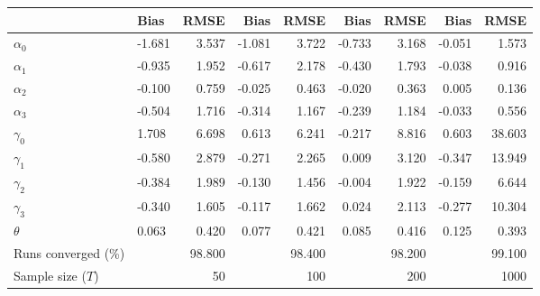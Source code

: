 
\begin{tabular}[t]{llrrrrrrr}
\toprule
  & Bias & RMSE & Bias & RMSE & Bias & RMSE & Bias & RMSE\\
\midrule
$\alpha_{0}$ & -1.681 & 3.537 & -1.081 & 3.722 & -0.733 & 3.168 & -0.051 & 1.573\\
$\alpha_{1}$ & -0.935 & 1.952 & -0.617 & 2.178 & -0.430 & 1.793 & -0.038 & 0.916\\
$\alpha_{2}$ & -0.100 & 0.759 & -0.025 & 0.463 & -0.020 & 0.363 & 0.005 & 0.136\\
$\alpha_{3}$ & -0.504 & 1.716 & -0.314 & 1.167 & -0.239 & 1.184 & -0.033 & 0.556\\
$\gamma_{0}$ & 1.708 & 6.698 & 0.613 & 6.241 & -0.217 & 8.816 & 0.603 & 38.603\\
$\gamma_{1}$ & -0.580 & 2.879 & -0.271 & 2.265 & 0.009 & 3.120 & -0.347 & 13.949\\
$\gamma_{2}$ & -0.384 & 1.989 & -0.130 & 1.456 & -0.004 & 1.922 & -0.159 & 6.644\\
$\gamma_{3}$ & -0.340 & 1.605 & -0.117 & 1.662 & 0.024 & 2.113 & -0.277 & 10.304\\
$\theta$ & 0.063 & 0.420 & 0.077 & 0.421 & 0.085 & 0.416 & 0.125 & 0.393\\
Runs converged (\%) &  & 98.800 &  & 98.400 &  & 98.200 &  & 99.100\\
Sample size ($T$) &  & 50 &  & 100 &  & 200 &  & 1000\\
\bottomrule
\end{tabular}

